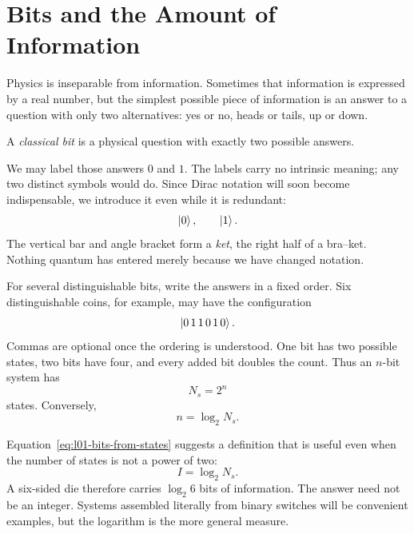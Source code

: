 \section{Bits and the Amount of Information}

Physics is inseparable from information. Sometimes that information is expressed by a real number, but the simplest possible piece of information is an answer to a question with only two alternatives: yes or no, heads or tails, up or down.

\begin{definition}
A \emph{classical bit} is a physical question with exactly two possible answers.
\end{definition}

We may label those answers \(0\) and \(1\). The labels carry no intrinsic meaning; any two distinct symbols would do. Since Dirac notation will soon become indispensable, we introduce it even while it is redundant:
\begin{equation}
  \left\lvert0\right\rangle,
  \qquad
  \left\lvert1\right\rangle.
\end{equation}
The vertical bar and angle bracket form a \emph{ket}, the right half of a bra--ket. Nothing quantum has entered merely because we have changed notation.

For several distinguishable bits, write the answers in a fixed order. Six distinguishable coins, for example, may have the configuration
\begin{equation}
  \left\lvert0\,1\,1\,0\,1\,0\right\rangle.
\end{equation}
Commas are optional once the ordering is understood. One bit has two possible states, two bits have four, and every added bit doubles the count. Thus an \(n\)-bit system has
\begin{equation}
  N_s=2^n
  \label{eq:l01-state-count}
\end{equation}
states. Conversely,
\begin{equation}
  n=\log_2 N_s.
  \label{eq:l01-bits-from-states}
\end{equation}

Equation~\eqref{eq:l01-bits-from-states} suggests a definition that is useful even when the number of states is not a power of two:
\begin{equation}
  I=\log_2 N_s.
  \label{eq:l01-information}
\end{equation}
A six-sided die therefore carries \(\log_2 6\) bits of information. The answer need not be an integer. Systems assembled literally from binary switches will be convenient examples, but the logarithm is the more general measure.

